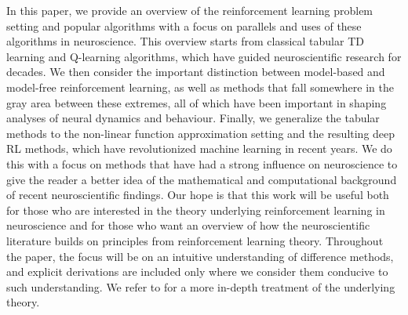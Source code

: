 In this paper, we provide an overview of the reinforcement learning problem setting and popular algorithms with a focus on parallels and uses of these algorithms in neuroscience.
This overview starts from classical tabular TD learning and Q-learning algorithms, which have guided neuroscientific research for decades.
We then consider the important distinction between model-based and model-free reinforcement learning, as well as methods that fall somewhere in the gray area between these extremes, all of which have been important in shaping analyses of neural dynamics and behaviour.
Finally, we generalize the tabular methods to the non-linear function approximation setting and the resulting deep RL methods, which have revolutionized machine learning in recent years.
We do this with a focus on methods that have had a strong influence on neuroscience to give the reader a better idea of the mathematical and computational background of recent neuroscientific findings.
Our hope is that this work will be useful both for those who are interested in the theory underlying reinforcement learning in neuroscience and for those who want an overview of how the neuroscientific literature builds on principles from reinforcement learning theory.
Throughout the paper, the focus will be on an intuitive understanding of difference methods, and explicit derivations are included only where we consider them conducive to such understanding.
We refer to \citet{sutton2018reinforcement} for a more in-depth treatment of the underlying theory.


